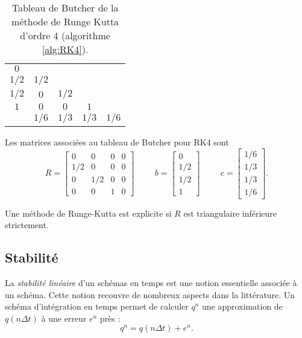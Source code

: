 \begin{table}[htbp]
\begin{center}
\begin{tabular}{c|cccc}
$0$   &       &      &      &      \\
$1/2$ & $1/2$ &      &      &      \\
$1/2$ & $0$   & $1/2$&      &      \\
$1$   & $0$   & $0$  & $1$  &      \\  
\hline
      & $1/6$ & $1/3$& $1/3$& $1/6$\\
\end{tabular}
\end{center}
\caption{Tableau de Butcher de la méthode de Runge Kutta d'ordre 4 (algorithme \ref{alg:RK4}).}
\end{table}
Les matrices associées au tableau de Butcher pour RK4 sont
\begin{equation}
R= \begin{bmatrix}
0 & 0 & 0 & 0 \\
1/2& 0& 0 & 0 \\
0 &1/2& 0 & 0 \\
0 & 0 & 1 & 0
\end{bmatrix}
\hspace{1cm}
b=\begin{bmatrix}
0\\1/2\\1/2\\1
\end{bmatrix}
\hspace{1cm}
c=\begin{bmatrix}
1/6\\1/3\\1/3\\1/6
\end{bmatrix}.
\end{equation}

\begin{proposition}
Une méthode de Runge-Kutta est explicite si $R$ est triangulaire inférieure strictement.
\end{proposition}




\subsection{Stabilité}

La \textit{stabilité linéaire} d'un schémas en temps est une notion essentielle associée à un schéma. Cette notion recouvre de nombreux aspects dans la littérature.
Un schéma d'intégration en temps permet de calculer $q^n$ une approximation de $q(n \Delta t)$ à une erreur $e^n$ près :
\begin{equation}
q^n = q(n \Delta t) + e^n.
\label{eq:scheme_erreur}
\end{equation}

